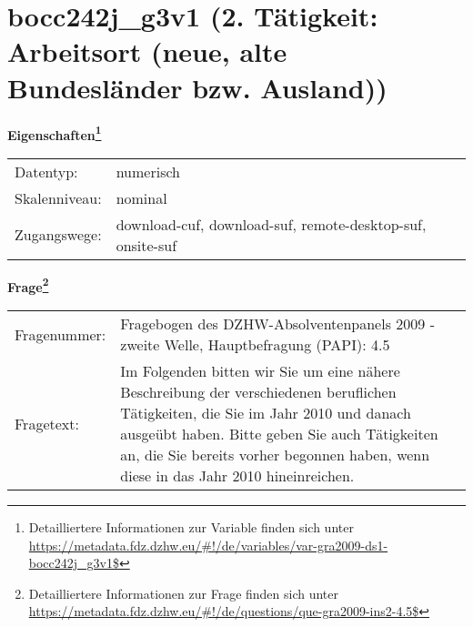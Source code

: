 
    \setcounter{footnote}{0}

    \vspace*{-1.8cm}
	\section{bocc242j\_g3v1 (2. Tätigkeit: Arbeitsort (neue, alte Bundesländer bzw. Ausland))}
	\label{section:bocc242j_g3v1}



    \vspace*{0.5cm}
    \noindent\textbf{Eigenschaften\footnote{Detailliertere Informationen zur Variable finden sich unter
		\url{https://metadata.fdz.dzhw.eu/\#!/de/variables/var-gra2009-ds1-bocc242j_g3v1$}}}\\
	\begin{tabularx}{\hsize}{@{}lX}
	Datentyp: & numerisch \\
	Skalenniveau: & nominal \\
	Zugangswege: &
	  download-cuf, 
	  download-suf, 
	  remote-desktop-suf, 
	  onsite-suf
 \\
    \end{tabularx}



				\vspace*{0.5cm}
                \noindent\textbf{Frage\footnote{Detailliertere Informationen zur Frage finden sich unter
		              \url{https://metadata.fdz.dzhw.eu/\#!/de/questions/que-gra2009-ins2-4.5$}}}\\
				\begin{tabularx}{\hsize}{@{}lX}
					Fragenummer: &
					  Fragebogen des DZHW-Absolventenpanels 2009 - zweite Welle, Hauptbefragung (PAPI):
					  4.5
 \\
					Fragetext: & Im Folgenden bitten wir Sie um eine nähere Beschreibung der verschiedenen beruflichen Tätigkeiten, die Sie im Jahr 2010 und danach ausgeübt haben. Bitte geben Sie auch Tätigkeiten an, die Sie bereits vorher begonnen haben, wenn diese in das Jahr 2010 hineinreichen. \\
				\end{tabularx}





